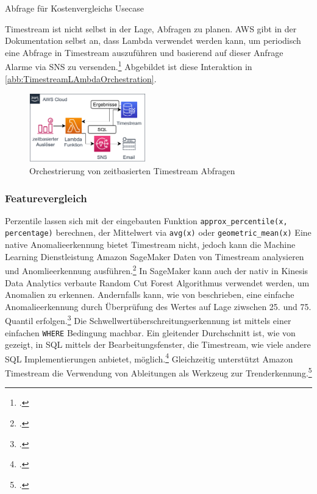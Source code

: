 \begin{listing}[H]
\inputminted[frame=lines,breaklines=true]{sql}{code/timestream-threshold.sql}
\caption{Abfrage für Kostenvergleichs Usecase}
\label{listing:timestream-kostenvergleich}
\end{listing}

Timestream ist nicht selbst in der Lage, Abfragen zu planen. \ac{AWS} gibt in der Dokumentation selbst an, dass Lambda verwendet werden kann, um periodisch eine Abfrage in Timestream auszuführen und basierend auf dieser Anfrage Alarme via \ac{SNS} zu versenden.\footcite[Vgl.][]{AmazonWebServicesInc..o.J.ag} Abgebildet ist diese Interaktion in \autoref{abb:TimestreamLAmbdaOrchestration}.


\begin{figure}[H]
\centering
\includegraphics[width=0.45\textwidth]{graphics/Lambda-Timestream-Orchestration.pdf}
\caption{Orchestrierung von zeitbasierten Timestream Abfragen}
\label{abb:TimestreamLAmbdaOrchestration}
\end{figure}

\subsubsection{Featurevergleich}
Perzentile lassen sich mit der eingebauten Funktion \texttt{approx_percentile(x, percentage)} berechnen, der Mittelwert via \texttt{avg(x)} oder \texttt{geometric_mean(x)}
Eine native Anomalieerkennung bietet Timestream nicht, jedoch kann die Machine Learning Dienstleistung Amazon SageMaker Daten von Timestream analysieren und Anomlieerkennung ausführen.\footcite[Vgl. auch im Folgenden][]{AmazonWebServicesInc..o.J.aj} In SageMaker kann auch der nativ in Kinesis Data Analytics verbaute Random Cut Forest Algorithmus verwendet werden, um Anomalien zu erkennen. Andernfalls kann, wie von \citeauthor{Salgado.2019} beschrieben, eine einfache Anomalieerkennung durch Überprüfung des Wertes auf Lage ziwschen 25. und 75. Quantil erfolgen.\footcite[Vgl.][]{Salgado.2019}
Die Schwellwertüberschreitungserkennung ist mittels einer einfachen \texttt{WHERE} Bedingung machbar.
Ein gleitender Durchschnitt ist, wie von \citeauthor{Ross.2020} gezeigt, in SQL mittels der Bearbeitungsfenster, die Timestream, wie viele andere \ac{SQL} Implementierungen anbietet, möglich.\footcite[Vgl.][]{Ross.2020} Gleichzeitig unterstützt Amazon Timestream die Verwendung von Ableitungen als Werkzeug zur Trenderkennung.\footcite[Vgl.][]{AmazonWebServicesInc..o.J.ai}

